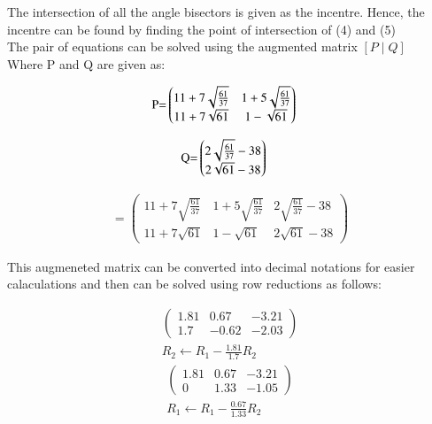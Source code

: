\documentclass[journal,12pt,twocolumn]{IEEEtran}
\theoremstyle{remark}
\begin{document}
\begin{flushleft}
    The intersection of all the angle bisectors is given as the incentre.
Hence, the incentre can be found by finding the point of intersection of (4) and (5)
\\
The pair of equations can be solved using the augmented matrix $[P \mid Q]$\\
Where P and Q are given as:
\end{flushleft}

\begin{align}
	\text{P=}&\begin{pmatrix}
		11 + 7\sqrt{\frac{61}{37}} & 1 + 5\sqrt{\frac{61}{37}}\\
		11 + 7\sqrt{61} & 1 - \sqrt{61}
	\end{pmatrix}
\end{align}

\begin{align}
	\text{Q=}&\begin{pmatrix}
		2\sqrt{\frac{61}{37}}-38\\
		2\sqrt{61}-38
	\end{pmatrix}
\end{align}

\begin{align}
	[P \mid Q]=
	\left(
\begin{array}{rr|r}
	11 + 7\sqrt{\frac{61}{37}} & 1 + 5\sqrt{\frac{61}{37}} & 2\sqrt{\frac{61}{37}}-38\\
		11 + 7\sqrt{61} & 1 - \sqrt{61} & 2\sqrt{61}-38
\end{array}
	\right)
\end{align}

\begin{flushleft}
	This augmeneted matrix can be converted into decimal notations for easier calaculations
	and then can be solved using row reductions as follows:
\end{flushleft}
\begin{align*}
	\left(
\begin{array}{rr|r}
	1.81 & 0.67 & -3.21\\
	1.7& -0.62 & -2.03
\end{array}
	\right)\\
R_{2} \leftarrow R_{1} - \frac{1.81}{1.7} R_{2}
\end{align*}
\begin{align*}
\left(
	\begin{array}{rr|r}
		1.81 & 0.67 & -3.21\\
		0& 1.33 & -1.05
	\end{array}
		\right)\\
R_{1} \leftarrow R_{1} - \frac{0.67}{1.33} R_{2}
\end{align*}
\end{document}
